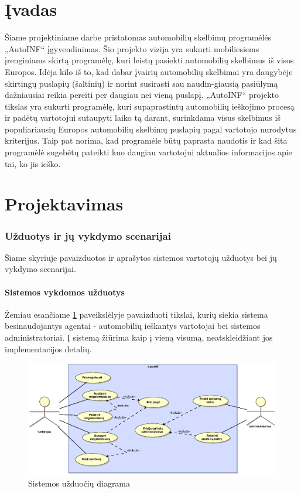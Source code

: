 \documentclass[12pt]{article}
\begin{document}
	\part*{Įvadas}
	Šiame projektiniame darbe pristatomas automobilių skelbimų programėlės „AutoINF“ įgyvendinimas. Šio projekto vizija yra sukurti mobiliesiems įrenginiams skirtą programėlę, kuri leistų pasiekti automobilių skelbimus iš visos Europos. Idėja kilo iš to, kad dabar įvairių automobilių skelbimai yra daugybėje skirtingų puslapių (šaltinių) ir norint susirasti sau naudin-giausią pasiūlymą dažniausiai reikia pereiti per daugiau nei vieną puslapį. „AutoINF“ projekto tikslas yra sukurti programėlę, kuri supaprastintų automobilių ieškojimo procesą ir padėtų vartotojui sutaupyti laiko tą darant, surinkdama visus skelbimus iš populiariausių Europos automobilių skelbimų puslapių pagal vartotojo nurodytus kriterijus. Taip pat norima, kad programėle būtų paprasta naudotis ir kad šita programėlė sugebėtų pateikti kuo daugiau vartotojui aktualios informacijos apie tai, ko jis ieško.
	\pagebreak
	
	\part*{Projektavimas}
	\section{Užduotys ir jų vykdymo scenarijai}
	Šiame skyriuje pavaizduotos ir aprašytos sistemos vartotojų užduotys bei jų vykdymo scenarijai.
	\subsection{Sistemos vykdomos užduotys}
	Žemiau esančiame \ref{UseCase} paveikslėlyje pavaizduoti tikslai, kurių siekia sistema besinaudojantys agentai - automobilių ieškantys vartotojai bei sistemos administratoriai. Į sistemą žiūrima kaip į vieną visumą, neatskleidžiant jos implementacijos detalių.
	
	\begin{figure}[h]
		\begin{center}
			\includegraphics[width=\textwidth]{Tikslai.eps}
			\caption{Sistemos užduočių diagrama\label{UseCase}}
		\end{center}
	\end{figure}
	
\end{document}
